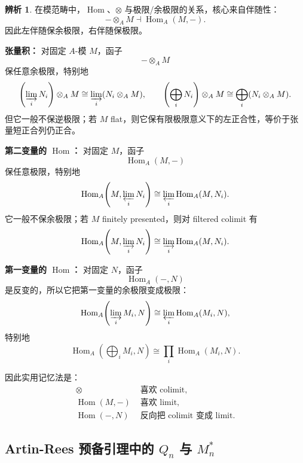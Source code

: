 \documentclass[a4paper]{ctexart}
\theoremstyle{definition}
\theoremstyle{analysis}
\newtheorem{remark}{辨析}[section]
\theoremstyle{plain}
\begin{document}
\begin{remark}
\label{rem:hom-tensor-limits}
在模范畴中，\(\operatorname{Hom}\)、\(\otimes\) 与极限/余极限的关系，核心来自伴随性：
\[
  -\otimes_A M \dashv \operatorname{Hom}_A(M,-).
\]
因此左伴随保余极限，右伴随保极限。

\textbf{张量积：} 对固定 \(A\)-模 \(M\)，函子
\[
  -\otimes_A M
\]
保任意余极限，特别地
\[
  \left(\varinjlim_i N_i\right)\otimes_A M
  \cong
  \varinjlim_i (N_i\otimes_A M),
  \qquad
  \left(\bigoplus_i N_i\right)\otimes_A M
  \cong
  \bigoplus_i(N_i\otimes_A M).
\]
但它一般不保逆极限；若 \(M\) flat，则它保有限极限意义下的左正合性，等价于张量短正合列仍正合。

\textbf{第二变量的 \(\operatorname{Hom}\)：} 对固定 \(M\)，函子
\[
  \operatorname{Hom}_A(M,-)
\]
保任意极限，特别地
\[
  \operatorname{Hom}_A\!\left(M,\varprojlim_i N_i\right)
  \cong
  \varprojlim_i \operatorname{Hom}_A(M,N_i).
\]
它一般不保余极限；若 \(M\) finitely presented，则对 filtered colimit 有
\[
  \operatorname{Hom}_A\!\left(M,\varinjlim_i N_i\right)
  \cong
  \varinjlim_i \operatorname{Hom}_A(M,N_i).
\]

\textbf{第一变量的 \(\operatorname{Hom}\)：} 对固定 \(N\)，函子
\[
  \operatorname{Hom}_A(-,N)
\]
是反变的，所以它把第一变量的余极限变成极限：
\[
  \operatorname{Hom}_A\!\left(\varinjlim_i M_i,N\right)
  \cong
  \varprojlim_i \operatorname{Hom}_A(M_i,N),
\]
特别地
\[
  \operatorname{Hom}_A\!\left(\bigoplus_i M_i,N\right)
  \cong
  \prod_i\operatorname{Hom}_A(M_i,N).
\]

因此实用记忆法是：
\[
  \begin{aligned}
  \otimes &\text{ 喜欢 colimit},\\
  \operatorname{Hom}(M,-)&\text{ 喜欢 limit},\\
  \operatorname{Hom}(-,N)&\text{ 反向把 colimit 变成 limit}.
  \end{aligned}
\]
\end{remark}

\subsection{\texorpdfstring{Artin-Rees 预备引理中的 \(Q_n\) 与 \(M_n^*\)}{Artin-Rees 预备引理中的 Qn 与 Mn*}}\label{subsec:artin-rees-qn}
\end{document}
